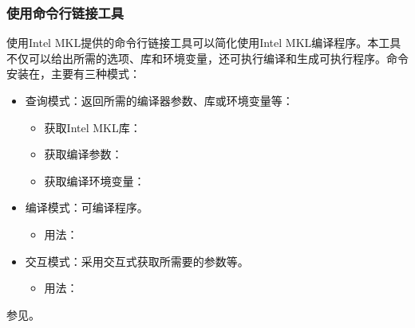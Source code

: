 \documentclass[a4paper,12pt,english]{sphinxmanual}
\begin{document}
\subsubsection{使用命令行链接工具}
\label{\detokenize{intel-mkl/intel-mkl:id10}}
\sphinxAtStartPar
使用Intel MKL提供的命令行链接工具可以简化使用Intel MKL编译程序。本工具不仅可以给出所需的选项、库和环境变量，还可执行编译和生成可执行程序。命令安装在，主要有三种模式：
\begin{itemize}
\item {} 
\sphinxAtStartPar
查询模式：返回所需的编译器参数、库或环境变量等：
\begin{itemize}
\item {} 
\sphinxAtStartPar
获取Intel MKL库：

\item {} 
\sphinxAtStartPar
获取编译参数：

\item {} 
\sphinxAtStartPar
获取编译环境变量：

\end{itemize}

\item {} 
\sphinxAtStartPar
编译模式：可编译程序。
\begin{itemize}
\item {} 
\sphinxAtStartPar
用法：

\end{itemize}

\item {} 
\sphinxAtStartPar
交互模式：采用交互式获取所需要的参数等。
\begin{itemize}
\item {} 
\sphinxAtStartPar
用法：

\end{itemize}

\end{itemize}

\sphinxAtStartPar
参见。
\end{document}
